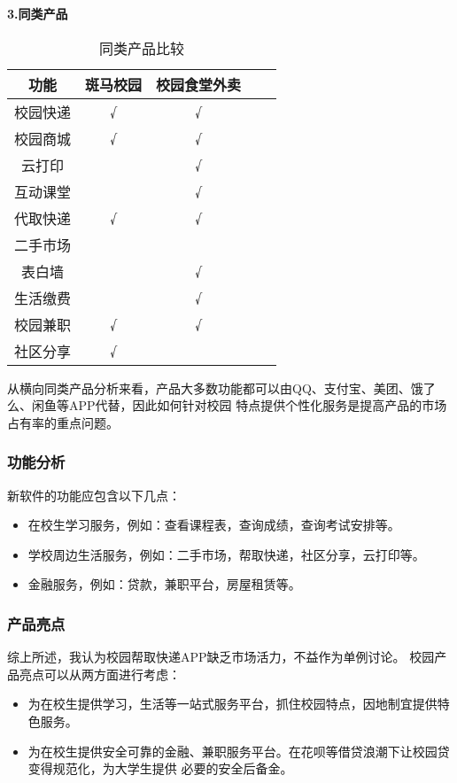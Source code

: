 \documentclass[withoutpreface,bwprint]{cumcmthesis} %
\begin{document}
\textbf{3.同类产品}
\begin{table}[!htbp]
    \caption{同类产品比较}\label{tab:001} \centering
    \begin{tabular}{ccccc}
        \toprule[1.5pt]
        功能 & 斑马校园 & 校园食堂外卖  \\
        \midrule[1pt]
        校园快递 & √ & √ \\
        校园商城 & √ & √ \\
        云打印 &  & √ \\
        互动课堂 &  & √  \\
        代取快递 &  √  & √ \\ 
        二手市场 &    &    \\
        表白墙 &    &  √  \\
        生活缴费 &    &  √  \\
        校园兼职 &  √  & √   \\
        社区分享 & √  &  \\
        \bottomrule[1.5pt]
    \end{tabular}
\end{table}

从横向同类产品分析来看，产品大多数功能都可以由QQ、支付宝、美团、饿了么、闲鱼等APP代替，因此如何针对校园
特点提供个性化服务是提高产品的市场占有率的重点问题。
\subsubsection{功能分析}
新软件的功能应包含以下几点：
\begin{itemize}
    \item 在校生学习服务，例如：查看课程表，查询成绩，查询考试安排等。
    \item 学校周边生活服务，例如：二手市场，帮取快递，社区分享，云打印等。
    \item 金融服务，例如：贷款，兼职平台，房屋租赁等。
    \end{itemize}
    \newpage
\subsubsection{产品亮点}
综上所述，我认为校园帮取快递APP缺乏市场活力，不益作为单例讨论。
校园产品亮点可以从两方面进行考虑：
\begin{itemize}
    \item 为在校生提供学习，生活等一站式服务平台，抓住校园特点，因地制宜提供特色服务。
    \item 为在校生提供安全可靠的金融、兼职服务平台。在花呗等借贷浪潮下让校园贷变得规范化，为大学生提供
    必要的安全后备金。
    \end{itemize}
\end{document}
